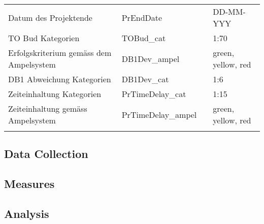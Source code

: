 \begin{landscape}
\begin{center}
\begin{longtable}{p{6cm}|p{4cm}|p{6cm}|p{3cm}}
		Datum des Projektende & PrEndDate &       & DD-MM-YYY \\
		TO Bud Kategorien & TOBud\_cat &       & {1:70} \\
		Erfolgskriterium gemäss dem Ampelsystem & DB1Dev\_ampel &       & {green, yellow, red} \\
		DB1 Abweichung Kategorien & DB1Dev\_cat &       & {1:6} \\
		Zeiteinhaltung Kategorien & PrTimeDelay\_cat &       & {1:15} \\
		Zeiteinhaltung gemäss Ampelsystem & PrTimeDelay\_ampel &       & {green, yellow, red} \\
		
	\label{tab:addlabel}%
\end{longtable}%
\end{center}
\end{landscape}
\subsection*{Data Collection}
\subsection*{Measures}
\subsection*{Analysis}